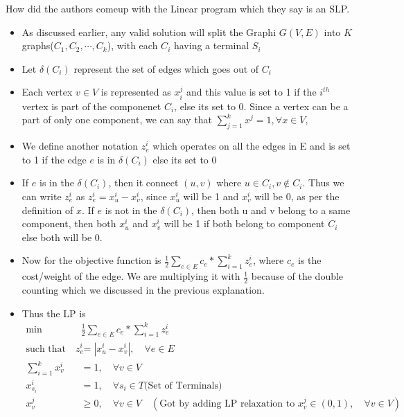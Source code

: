 \documentclass[11pt]{article}
\begin{document}
How did the authors comeup with the Linear program which they say is an SLP.
\begin{itemize}
    \item As discussed earlier, any valid solution will split the Graphi $G(V,E)$ into $K$ graphs($C_1, C_2,\cdots,C_k$), with each $C_i$ having a terminal $S_i$
    \item Let $\delta(C_i)$ represent the set of edges which goes out of $C_i$
    \item Each vertex $v \in V$ is represented as $x_i^j$ and this value is set to 1 if the $i^{th}$ vertex is part of the componenet $C_i$, else its set to 0. Since a vertex can be a part of only one component, we can say that $\sum_{j=1}^{k}{x^j} = 1, \forall x \in V$, 
    \item We define another notation $z_e^i$ which operates on all the edges in E and is set to 1 if the edge $e$ is in $\delta(C_i)$ else its set to 0
    \item If $e$ is in the $\delta(C_i)$, then it connect $(u,v)$ where $u \in C_i, v \notin C_i$. Thus we can write $z_e^i$ as $z_e^i = x_u^i - x_v^i$, since $x_u^i$ will be 1 and $x_v^i$ will be 0, as per the definition of $x$. If $e$ is not in the $\delta(C_i)$, then both u and v belong to a same component, then both $x_u^i$ and $x_v^i$ will be 1 if both belong to component $C_i$ else both will be 0.
    \item Now for the objective function is $\frac{1}{2}\sum\limits_{e \in E}{c_e * \sum\limits_{i=1}^{k}{z_e^i}}$, where $c_e$ is the cost/weight of the edge. We are multiplying it with $\frac{1}{2}$ because of the double counting which we discussed in the previous explanation.
    \item Thus the LP is 
        \begin{align*}
            \min \quad & \frac{1}{2}\sum\limits_{e \in E}{c_e * \sum\limits_{i=1}^{k}{z_e^i}}\\
            \text{such that}  \quad z_e^i &= |x_u^i - x_v^i|, \quad \forall e \in E\\
            \sum\limits_{i=1}^{k}{x_v^i} &= 1,\quad \forall v \in V\\
            x_{s_i}^i &= 1,\quad \forall s_i \in T\text{(Set of Terminals)}\\
            x_v^j &\ge 0, \quad \forall v \in V\quad (\text{Got by adding LP relaxation to }x_v^j \in (0,1),\quad \forall v \in V)\\
        \end{align*}
\end{itemize}
\end{document}
